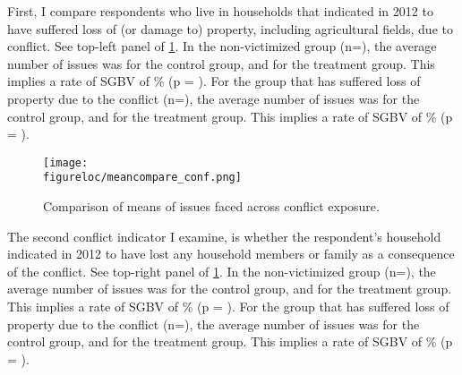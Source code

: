 \documentclass[10pt,a4paper,abstract=on]{scrartcl} %
\newcommand{\figureloc}{C:/Users/Koen/Dropbox/PhD/Papers/CongoGBV/Figures}
\begin{document}
First, I compare respondents who live in households that indicated in 2012 to have suffered loss of (or damage to) property, including agricultural fields, due to conflict. See top-left panel of \ref{fig:meancompare_conf}. In the non-victimized group (n=), the average number of issues was  for the control group, and  for the treatment group. This implies a rate of SGBV of \% (p = ). For the group that has suffered loss of property due to the conflict (n=), the average number of issues was  for the control group, and  for the treatment group. This implies a rate of SGBV of \% (p = ).

\begin{figure}[htb]
  \texttt{[image: \\figureloc/meancompare\_conf.png]}
  \caption{Comparison of means of issues faced across conflict exposure.}
  \label{fig:meancompare_conf}
\end{figure}

The second conflict indicator I examine, is whether the respondent's household indicated in 2012 to have lost any household members or family as a consequence of the conflict. See top-right panel of \ref{fig:meancompare_conf}. In the non-victimized group (n=), the average number of issues was  for the control group, and  for the treatment group. This implies a rate of SGBV of \% (p = ). For the group that has suffered loss of property due to the conflict (n=), the average number of issues was  for the control group, and  for the treatment group. This implies a rate of SGBV of \% (p = ).
\end{document}
